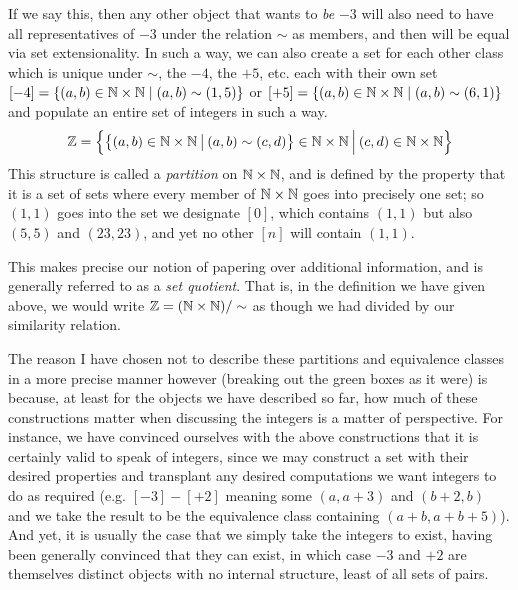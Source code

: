 \documentclass[11pt]{article}
\begin{document}
If we say this, then any other object that wants to \emph{be} $-3$ will also need to have all representatives of $-3$ under the relation $\sim$ as members, and then will be equal via set extensionality. In such a way, we can also create a set for each other class which is unique under $\sim$, the $-4$, the $+5$, etc. each with their own set $[-4] = \{(a,b) \in \mathbb{N} \times \mathbb{N} \mid (a,b) \sim (1,5)\}$ or $[+5]=\{(a,b) \in \mathbb{N} \times \mathbb{N} \mid (a,b) \sim (6,1)\}$ and populate an entire set of integers in such a way. \begin{gather*}
\mathbb{Z} = \Big\{ \big\{ (a,b) \in \mathbb{N} \times \mathbb{N} \hspace{0.2em} \big| \hspace{0.2em} (a,b) \sim (c,d) \big\} \in \mathbb{N} \times \mathbb{N} \hspace{0.2em} \Big| \hspace{0.2em} (c,d) \in \mathbb{N} \times \mathbb{N} \Big\}
\end{gather*}
This structure is called a \emph{partition} on $\mathbb{N} \times \mathbb{N}$, and is defined by the property that it is a set of sets where every member of $\mathbb{N} \times\mathbb{N}$ goes into precisely one set; so $(1,1)$ goes into the set we designate $[0]$, which contains $(1,1)$ but also $(5,5)$ and $(23,23)$, and yet no other $[n]$ will contain $(1,1)$.

This makes precise our notion of papering over additional information, and is generally referred to as a \emph{set quotient}. That is, in the definition we have given above, we would write $\mathbb{Z} = (\mathbb{N} \times \mathbb{N})/\sim$ as though we had divided by our similarity relation.

The reason I have chosen not to describe these partitions and equivalence classes in a more precise manner however (breaking out the green boxes as it were) is because, at least for the objects we have described so far, how much of these constructions matter when discussing the integers is a matter of perspective. For instance, we have convinced ourselves with the above constructions that it is certainly valid to speak of integers, since we may construct a set with their desired properties and transplant any desired computations we want integers to do as required (e.g. $[-3] - [+2]$ meaning some $(a,a+3)$ and $(b+2,b)$ and we take the result to be the equivalence class containing $(a+b,a+b + 5)$). And yet, it is usually the case that we simply take the integers to exist, having been generally convinced that they can exist, in which case $-3$ and $+2$ are themselves distinct objects with no internal structure, least of all sets of pairs. 
\end{document}
